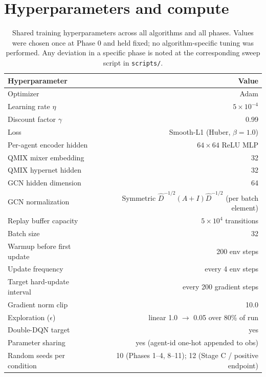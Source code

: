 \documentclass[10pt]{article}
\begin{document}
\section{Hyperparameters and compute}
\label{app:hparams}

\begin{table}[!ht]
  \centering
  \small
  \caption{Shared training hyperparameters across all algorithms and
  all phases. Values were chosen once at Phase 0 and held fixed; no
  algorithm-specific tuning was performed. Any deviation in a specific
  phase is noted at the corresponding sweep script in \texttt{scripts/}.}
  \label{tab:hparams_shared}
  \begin{tabular}{lr}
    \toprule
    Hyperparameter & Value \\
    \midrule
    Optimizer                    & Adam \\
    Learning rate $\eta$         & $5 \times 10^{-4}$ \\
    Discount factor $\gamma$     & 0.99 \\
    Loss                         & Smooth-L1 (Huber, $\beta=1.0$) \\
    Per-agent encoder hidden     & $64 \times 64$ ReLU MLP \\
    QMIX mixer embedding         & 32 \\
    QMIX hypernet hidden         & 32 \\
    GCN hidden dimension         & 64 \\
    GCN normalization            & Symmetric $\hat D^{-1/2}(A+I)\hat D^{-1/2}$ (per batch element) \\
    Replay buffer capacity       & $5 \times 10^4$ transitions \\
    Batch size                   & 32 \\
    Warmup before first update   & 200 env steps \\
    Update frequency             & every 4 env steps \\
    Target hard-update interval  & every 200 gradient steps \\
    Gradient norm clip           & 10.0 \\
    Exploration ($\epsilon$)     & linear 1.0 $\rightarrow$ 0.05 over 80\% of run \\
    Double-DQN target            & yes \\
    Parameter sharing            & yes (agent-id one-hot appended to obs) \\
    Random seeds per condition   & 10 (Phases 1--4, 8--11); 12 (Stage C / positive endpoint) \\
    \bottomrule
  \end{tabular}
\end{table}
\end{document}

